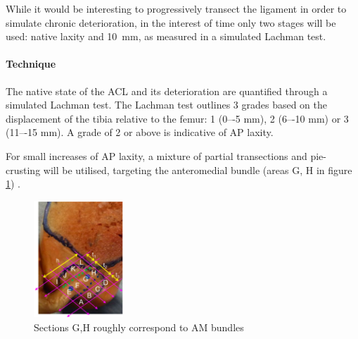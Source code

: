 While it would be interesting to progressively transect the ligament in order to simulate chronic deterioration, in the interest of time only two stages will be used: native laxity and \SI{10}{mm}, as measured in a simulated Lachman test.

\paragraph{Technique}
The native state of the ACL and its deterioration are quantified through a simulated Lachman test. 
The Lachman test outlines 3 grades based on the displacement of the tibia relative to the femur: 1 (0–-5 mm), 2 (6–-10 mm) or 3 (11–-15 mm).
A grade of 2 or above is indicative of AP laxity.

For small increases of AP laxity, a mixture of partial transections and pie-crusting \cite{clarke_clinical_2005} will be utilised, targeting the anteromedial bundle (areas G, H in figure \ref{fig:am-pl-bundle}) \cite{kawaguchi_role_2015}.
\begin{figure}[]\centering
    \includegraphics[width=0.3\textwidth]{figures/am-pl-bundles}
    \caption{Sections G,H roughly correspond to AM bundles \cite{kawaguchi_role_2015}}
\label{fig:am-pl-bundle}
\end{figure}
